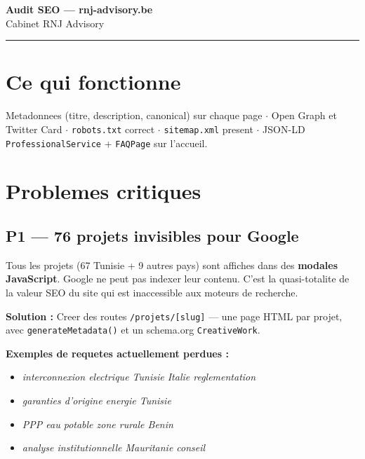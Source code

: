 \documentclass[12pt, a4paper]{article}
\newcommand{\f}[1]{\texttt{\small\color{rnjdark}#1}}
\begin{document}
\begin{center}
  {\LARGE\bfseries\color{rnjdark} Audit SEO --- rnj-advisory.be}\\[0.8em]
  \textcolor{gris}{\small Cabinet RNJ Advisory}
\end{center}

\vspace{0.5em}
\textcolor{rnjolive}{\rule{\linewidth}{1pt}}
\vspace{1em}

\section{Ce qui fonctionne}

\begin{okbox}
Metadonnees (titre, description, canonical) sur chaque page $\cdot$
Open Graph et Twitter Card $\cdot$
\f{robots.txt} correct $\cdot$
\f{sitemap.xml} present $\cdot$
JSON-LD \texttt{ProfessionalService} + \texttt{FAQPage} sur l'accueil.
\end{okbox}

\section{Problemes critiques}

\subsection{P1 --- 76 projets invisibles pour Google}

\begin{alertbox}
Tous les projets (67 Tunisie + 9 autres pays) sont affiches dans des
\textbf{modales JavaScript}. Google ne peut pas indexer leur contenu.
C'est la quasi-totalite de la valeur SEO du site qui est inaccessible
aux moteurs de recherche.
\end{alertbox}

\textbf{Solution :} Creer des routes \f{/projets/[slug]} --- une page HTML par
projet, avec \texttt{generateMetadata()} et un schema.org \texttt{CreativeWork}.

\textbf{Exemples de requetes actuellement perdues :}
\begin{itemize}[leftmargin=1.5em, topsep=4pt]
  \item \emph{interconnexion electrique Tunisie Italie reglementation}
  \item \emph{garanties d'origine energie Tunisie}
  \item \emph{PPP eau potable zone rurale Benin}
  \item \emph{analyse institutionnelle Mauritanie conseil}
\end{itemize}
\end{document}
